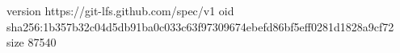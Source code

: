 version https://git-lfs.github.com/spec/v1
oid sha256:1b357b32c04d5db91ba0c033c63f97309674ebefd86bf5eff0281d1828a9cf72
size 87540
